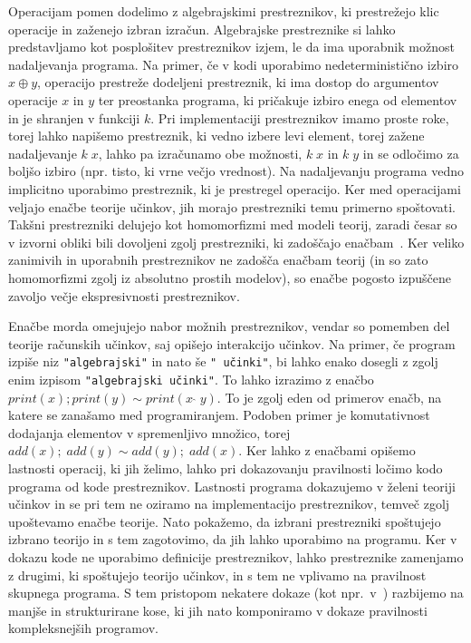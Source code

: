 \documentclass{article}
\begin{document}
Operacijam pomen dodelimo z algebrajskimi prestreznikov, ki prestrežejo klic operacije in zaženejo izbran izračun. Algebrajske prestreznike si lahko predstavljamo kot posplošitev prestreznikov izjem, le da ima uporabnik možnost nadaljevanja programa. Na primer, če v kodi uporabimo nedeterministično izbiro $x \oplus y$, operacijo prestreže dodeljeni prestreznik, ki ima dostop do argumentov operacije $x$ in $y$ ter preostanka programa, ki pričakuje izbiro enega od elementov in je shranjen v funkciji $k$. Pri implementaciji prestreznikov imamo proste roke, torej lahko napišemo prestreznik, ki vedno izbere levi element, torej zažene nadaljevanje $k\; x$, lahko pa izračunamo obe možnosti, $k\; x$ in $k\; y$ in se odločimo za boljšo izbiro (npr. tisto, ki vrne večjo vrednost). Na nadaljevanju programa vedno implicitno uporabimo prestreznik, ki je prestregel operacijo. Ker med operacijami veljajo enačbe teorije učinkov, jih morajo prestrezniki temu primerno spoštovati. Takšni prestrezniki delujejo kot homomorfizmi med modeli teorij, zaradi česar so v izvorni obliki bili dovoljeni zgolj prestrezniki, ki zadoščajo enačbam~\cite{DBLP:conf/esop/PlotkinP09}. Ker veliko zanimivih in uporabnih prestreznikov ne zadošča enačbam teorij (in so zato homomorfizmi zgolj iz absolutno prostih modelov), so enačbe pogosto izpuščene zavoljo večje ekspresivnosti prestreznikov.

Enačbe morda omejujejo nabor možnih prestreznikov, vendar so pomemben del teorije računskih učinkov, saj opišejo interakcijo učinkov. Na primer, če program izpiše niz \texttt{"algebrajski"} in nato še \texttt{" učinki"}, bi lahko enako dosegli z zgolj enim izpisom \texttt{"algebrajski učinki"}. To lahko izrazimo z enačbo $print(x); print(y) \sim print(x\;\hat{}\;y)$. To je zgolj eden od primerov enačb, na katere se zanašamo med programiranjem. Podoben primer je komutativnost dodajanja elementov v spremenljivo množico, torej $add(x);\; add(y) \sim add(y);\; add(x)$. Ker lahko z enačbami opišemo lastnosti operacij, ki jih želimo, lahko pri dokazovanju pravilnosti ločimo kodo programa od kode prestreznikov. Lastnosti programa dokazujemo v želeni teoriji učinkov in se pri tem ne oziramo na implementacijo prestreznikov, temveč zgolj upoštevamo enačbe teorije. Nato pokažemo, da izbrani prestrezniki spoštujejo izbrano teorijo in s tem zagotovimo, da jih lahko uporabimo na programu. Ker v dokazu kode ne uporabimo definicije prestreznikov, lahko prestreznike zamenjamo z drugimi, ki spoštujejo teorijo učinkov, in s tem ne vplivamo na pravilnost skupnega programa. S tem pristopom nekatere dokaze (kot npr.\ v~\cite{DBLP:journals/jlp/BauerP15}) razbijemo na manjše in strukturirane kose, ki jih nato komponiramo v dokaze pravilnosti kompleksnejših programov.
\end{document}
